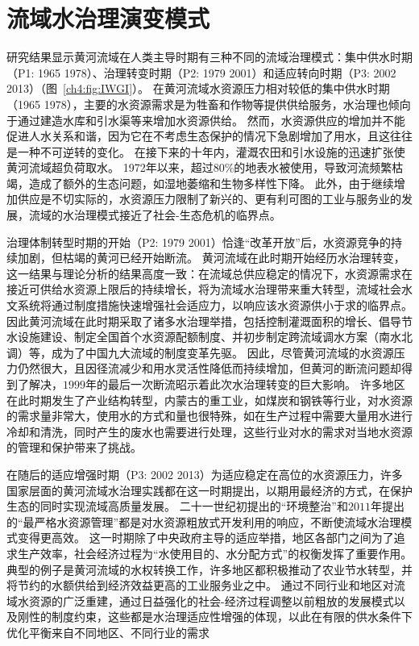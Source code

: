 \section{流域水治理演变模式}

研究结果显示黄河流域在人类主导时期有三种不同的流域治理模式：集中供水时期（P1: 1965 \textendash{} 1978）、治理转变时期（P2: 1979 \textendash{} 2001）和适应转向时期（P3: 2002 \textendash{} 2013）（图~\ref{ch4:fig:IWGI}）。
在黄河流域水资源压力相对较低的集中供水时期（1965 \textendash{} 1978），主要的水资源需求是为牲畜和作物等提供供给服务，水治理也倾向于通过建造水库和引水渠等来增加水资源供给。
然而，水资源供应的增加并不能促进人\textendash{}水关系和谐，因为它在不考虑生态保护的情况下急剧增加了用水，且这往往是一种不可逆转的变化\cite{zhou2020}。
在接下来的十年内，灌溉农田和引水设施的迅速扩张使黄河流域超负荷取水。
1972年以来，超过$80\%$的地表水被使用，导致河流频繁枯竭，造成了额外的生态问题，如湿地萎缩和生物多样性下降\cite{wang2019c, fu2021}。
此外，由于继续增加供应是不切实际的，水资源压力限制了新兴的、更有利可图的工业与服务业的发展，流域的水治理模式接近了社会-生态危机的临界点\cite{loch2020, wohlfart2016}。

治理体制转型时期的开始（P2: 1979 \textendash{} 2001）恰逢“改革开放”后，水资源竞争的持续加剧，但枯竭的黄河已经开始断流。
黄河流域在此时期开始经历水治理转变，这一结果与理论分析的结果高度一致：在流域总供应稳定的情况下，水资源需求在接近可供给水资源上限后的持续增长，将为流域水治理带来重大转型，流域社会\textendash{}水文系统将通过制度措施快速增强社会适应力，以响应该水资源供小于求的临界点\cite{loch2020}。
因此黄河流域在此时期采取了诸多水治理举措，包括控制灌溉面积的增长、倡导节水设施建设、制定全国首个水资源配额制度、并初步制定跨流域调水方案（南水北调）等\cite{wang2019b,long2020,nickum2021}，成为了中国九大流域的制度变革先驱。
因此，尽管黄河流域的水资源压力仍然很大，且因径流减少和用水灵活性降低而持续增加，但黄河的断流问题却得到了解决，$1999$年的最后一次断流昭示着此次水治理转变的巨大影响\cite{wang2019b}。
许多地区在此时期发生了产业结构转型，内蒙古的重工业，如煤炭和钢铁等行业，对水资源的需求量非常大，使用水的方式和量也很特殊，如在生产过程中需要大量用水进行冷却和清洗，同时产生的废水也需要进行处理，这些行业对水的需求对当地水资源的管理和保护带来了挑战。

在随后的适应增强时期（P3: 2002 \textendash{} 2013）为适应稳定在高位的水资源压力，许多国家层面的黄河流域水治理实践都在这一时期提出，以期用最经济的方式，在保护生态的同时实现流域高质量发展。
二十一世纪初提出的“环境整治”和$2011$年提出的“最严格水资源管理”都是对水资源粗放式开发利用的响应，不断使流域水治理模式变得更高效。
这一时期除了中央政府主导的适应举措，地区各部门之间为了追求生产效率，社会经济过程为“水使用目的、水分配方式”的权衡发挥了重要作用。
典型的例子是黄河流域的水权转换工作，许多地区都积极推动了农业节水转型，并将节约的水额供给到经济效益更高的工业服务业之中。
通过不同行业和地区对流域水资源的广泛重建，通过日益强化的社会-经济过程调整以前粗放的发展模式以及刚性的制度约束，这些都是水治理适应性增强的体现，以此在有限的供水条件下优化平衡来自不同地区、不同行业的需求\cite{dalin2015,song2022}


